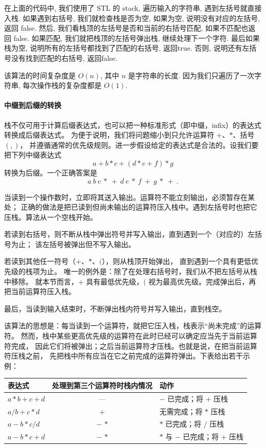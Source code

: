 \documentclass[a4paper]{ctexart}
\theoremstyle{definition}
\theoremstyle{definition}
\begin{document}
在上面的代码中, 我们使用了 STL 的 stack, 遍历输入的字符串, 遇到左括号就直接入栈. 
如果遇到右括号, 我们就检查栈是否为空, 如果为空, 说明没有对应的左括号, 返回 false. 
然后, 我们看栈顶的左括号是否和当前的右括号匹配, 如果不匹配也返回 false. 如果匹配, 
我们就把栈顶的左括号弹出栈, 继续处理下一个字符. 最后如果栈为空, 
说明所有的左括号都找到了匹配的右括号, 返回true. 否则, 说明还有左括号没有找到匹配的右括号, 
返回false. 

该算法的时间复杂度是 $O(n)$, 其中 $n$ 是字符串的长度. 因为我们只遍历了一次字符串, 
每次操作栈的复杂度都是 $O(1)$.

\paragraph{中缀到后缀的转换}

\noindent
栈不仅可用于计算后缀表达式，也可以把一种标准形式（即中缀，infix）的表达式转换成后缀表达式。
为便于说明，我们将问题缩小到只允许运算符 $+$、$*$、括号 $(,)$，
并遵循通常的优先级规则。进一步假设给定的表达式是合法的。设我们要把下列中缀表达式
\[
a + b * c + ( d * e + f ) * g
\]
转换为后缀。一个正确答案是
\[
a\ b\ c\ *\ +\ d\ e\ *\ f\ +\ g\ *\ +\ .
\]

\noindent
当读到一个操作数时，立即将其送入输出。运算符不能立刻输出，必须暂存在某处；
正确的做法是把已读到但尚未输出的运算符压入栈中。遇到左括号时也把它压栈。算法从一个空栈开始。

\noindent
若读到右括号，则不断从栈中弹出符号并写入输出，直到遇到一个（对应的）左括号为止；
该左括号被弹出但不写入输出。

\noindent
若读到其他任一符号（$+$、$*$、$($），则从栈顶开始弹出，
直到遇到一个具有更低优先级的栈项为止。
唯一的例外是：除了在处理右括号时，我们从不把左括号从栈中移除。
就本节而言，$+$ 具有最低优先级，$($ 视为最高优先级。完成弹出后，再把当前运算符压入栈。

\noindent
最后，当读到输入结束时，不断弹出栈内符号并写入输出，直到栈空。

\noindent
该算法的思想是：每当读到一个运算符，就把它压入栈，栈表示“尚未完成”的运算符。
然而，栈中某些更高优先级的运算符在此时已经可以确定应当先于当前运算符完成，
因此它们将被弹出；之后当前运算符才压栈。也就是说，在把当前运算符压栈之前，
先把栈中所有应当在它之前完成的运算符弹出。下表给出若干示例：

\begin{center}
\begin{tabular}{lcl}
\hline
表达式 & 处理到第三个运算符时栈内情况 & 动作\\
\hline
$a*b+c+d$ & --- & $-$ 已完成；将 $+$ 压栈\\
$a/b+c*d$ & $+$ & 无需完成；将 $*$ 压栈\\
$a-b*c/d$ & $-$ $*$ & $*$ 已完成；将 $/$ 压栈\\
$a-b*c+d$ & $-$ $*$ & $*$ 与 $-$ 已完成；将 $+$ 压栈\\
\hline
\end{tabular}
\end{center}
\end{document}
